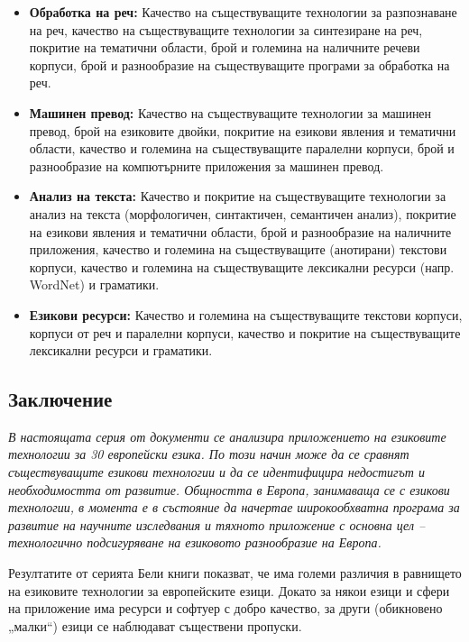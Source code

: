 \begin{multicols}{2}
  \begin{itemize}
  \item \textbf{Обработка на реч:} Качество на съществуващите технологии
    за разпознаване на реч, качество на съществуващите технологии за
    синтезиране на реч, покритие на тематични области, брой и големина
    на наличните речеви корпуси, брой и разнообразие на съществуващите
    програми за обработка на реч.
  \item \textbf{Машинен превод:} Качество на съществуващите технологии
    за машинен превод, брой на езиковите двойки, покритие на езикови
    явления и тематични области, качество и големина на съществуващите
    паралелни корпуси, брой и разнообразие на компютърните приложения за
    машинен превод.
  \item \textbf{Анализ на текста:} Качество и покритие на съществуващите
    технологии за анализ на текста (морфологичен, синтактичен,
    семантичен анализ), покритие на езикови явления и тематични области,
    брой и разнообразие на наличните приложения, качество и големина на
    съществуващите (анотирани) текстови корпуси, качество и големина на
    съществуващите лексикални ресурси (напр. WordNet) и граматики.
  \item \textbf{Езикови ресурси:} Качество и големина на съществуващите
    текстови корпуси, корпуси от реч и паралелни корпуси, качество и
    покритие на съществуващите лексикални ресурси и граматики.
  \end{itemize} 

  \subsection{Заключение}

  \emph{В настоящата серия от документи се анализира приложението на
    езиковите технологии за 30 европейски езика. По този начин може да
    се сравнят съществуващите езикови технологии и да се идентифицира
    недостигът и необходимостта от развитие. Общността в Европа,
    занимаваща се с езикови технологии, в момента е в състояние да
    начертае широкообхватна програма за развитие на научните изследвания
    и тяхното приложение с основна цел -- технологично подсигуряване на
    езиковото разнообразие на Европа.}

  Резултатите от серията Бели книги показват, че има големи различия в равнището на езиковите технологии
  за европейските езици. Докато за някои езици и сфери на приложение има
  ресурси и софтуер с добро качество, за други (обикновено „малки“)
  езици се наблюдават съществени пропуски.


\end{multicols}
